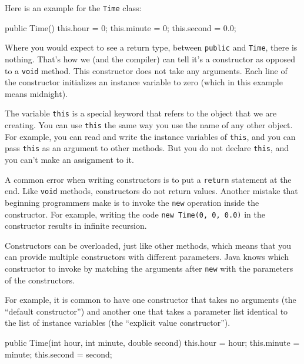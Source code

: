 \documentclass[12pt]{book}
\makeatletter
\renewcommand\subsection{\@startsection{subsection}{2}{\z@}%
    {-3.25ex\@plus -1ex \@minus -.2ex}%
    {0.3ex \@plus .2ex}%
    {\normalfont\large\bfseries}}
\theoremstyle{exercise}
\newcommand{\java}[1]{\lstinline{#1}} %
\makeatother
\begin{document}
Here is an example for the \java{Time} class:

\begin{code}
    public Time() {
        this.hour = 0;
        this.minute = 0;
        this.second = 0.0;
    }
\end{code}

Where you would expect to see a return type, between \java{public} and \java{Time}, there is nothing.
That's how we (and the compiler) can tell it's a constructor as opposed to a \java{void} method.
This constructor does not take any arguments.
Each line of the constructor initializes an instance variable to zero (which in this example means midnight).


The variable \java{this} is a special keyword that refers to the object that we are creating.
You can use \java{this} the same way you use the name of any other object.
For example, you can read and write the instance variables of \java{this}, and you can pass \java{this} as an argument to other methods.
But you do not declare \java{this}, and you can't make an assignment to it.

A common error when writing constructors is to put a \java{return} statement at the end.
Like \java{void} methods, constructors do not return values.
Another mistake that beginning programmers make is to invoke the \java{new} operation inside the constructor.
For example, writing the code \java{new Time(0, 0, 0.0)} in the constructor results in infinite recursion.



Constructors can be overloaded, just like other methods, which means that you can provide multiple constructors with different parameters.
Java knows which constructor to invoke by matching the arguments after \java{new} with the parameters of the constructors.

For example, it is common to have one constructor that takes no arguments (the ``default constructor'') and another one that takes a parameter list identical to the list of instance variables (the ``explicit value constructor'').

\begin{code}
    public Time(int hour, int minute, double second) {
        this.hour = hour;
        this.minute = minute;
        this.second = second;
    }
\end{code}
\end{document}

